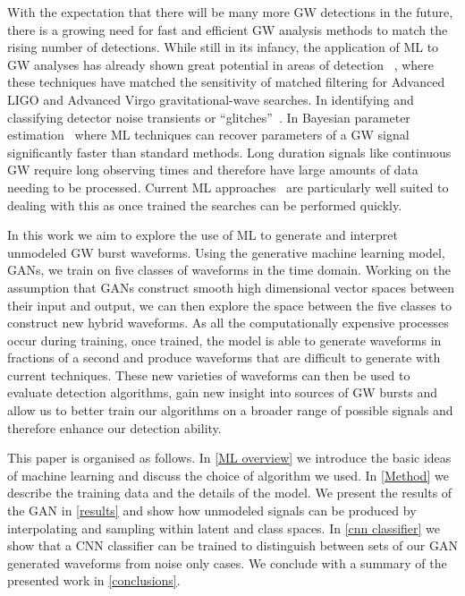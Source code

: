 \documentclass[12pt]{iopart}
\begin{document}
%
With the expectation that there will be many more \ac{GW} detections in the
future, there is a growing need for fast and efficient \ac{GW} analysis methods
to match the rising number of detections. While still in its infancy, the application of \ac{ML} to \ac{GW} analyses has already shown great potential in areas of detection ~\cite{Gabbard2017,Gebhard_2019,Krastev_2020}, where these techniques have matched the sensitivity of matched filtering for Advanced LIGO and Advanced Virgo gravitational-wave searches. In identifying and classifying detector noise transients or  ``glitches''~\cite{Bahaadini, George_2018,Razzano_2018, 2020arXiv200801262G}. In Bayesian parameter
estimation~\cite{gabbard2019bayesian, green2020gravitationalwave} where \ac{ML} techniques can recover parameters of a \ac{GW} signal significantly faster than standard methods. Long duration signals like continuous \ac{GW} require long observing times and therefore have large amounts of data needing to be processed. Current \ac{ML} approaches~\cite{2020PhRvD.102b2005D, 2019PhRvD.100d4009D, 2020arXiv200708207B} are particularly well suited to dealing with this as once trained the searches can be performed quickly.

%
In this work we aim to explore the use of \ac{ML} to generate and interpret
unmodeled \ac{GW} burst waveforms. Using the generative machine learning
model, \acp{GAN}, we train on five classes of waveforms in the time domain. Working on the assumption that \acp{GAN} construct smooth
 high dimensional vector spaces between their input and output, we can then
explore the space between the five classes to construct new
hybrid waveforms. As all the computationally expensive
processes occur during training, once trained, the model is able to
generate waveforms in fractions of a second and produce waveforms that are difficult to generate with current
techniques. These new varieties of waveforms can then be used to evaluate
detection algorithms, gain new insight into sources of \ac{GW}
bursts and  allow us to better train our algorithms on a
broader range of possible signals and therefore enhance our detection ability. 

%
This paper is organised as follows. In \cref{ML overview} we introduce the basic ideas of machine learning and discuss the choice of algorithm we used. In \cref{Method} we describe the training data and the details of the model. We present the results of the GAN in \cref{results} and show how unmodeled signals can be produced by interpolating and sampling within latent and class spaces. In \cref{cnn classifier} we show that a \ac{CNN} classifier can be trained to distinguish between sets of our \ac{GAN} generated waveforms from noise only cases. We conclude with a summary of the presented work in \cref{conclusions}.
\end{document}

